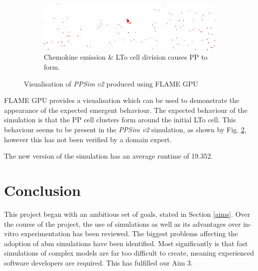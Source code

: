 \documentclass{UoYCSproject}
\begin{document}
\begin{figure}[htpb]\ContinuedFloat
\begin{subfigure}{\textwidth}
\centering
\includegraphics[width=\textwidth]{Appendix/Sim/Patch}
\caption{Chemokine emission \& \gls{LTo} cell division causes \gls{PP} to form.}
\label{fig:sim_patch}
\end{subfigure}


\caption{Visualisation of \textit{PPSim v2} produced using \gls{FLAME GPU}}
\label{fig:ppsimv2_vis}
\end{figure}

\gls{FLAME GPU} provides a visualisation which can be used to demonstrate the appearance of the expected emergent behaviour.
The expected behaviour of the simulation is that the \gls{PP} cell clusters form around the initial \gls{LTo} cell.
This behaviour seems to be present in the \textit{PPSim v2} simulation, as shown by Fig. \ref{fig:ppsimv2_vis}, however this has not been verified by a domain expert.

The new version of the simulation has an average runtime of 19.352.

\section{Conclusion}
This project began with an ambitious set of goals, stated in Section \ref{aims}.
Over the course of the project, the use of simulations as well as its advantages over \gls{in-vitro} experimentation has been reviewed.
The biggest problems affecting the adoption of \gls{abm} simulations have been identified.
Most significantly is that fast simulations of complex models are far too difficult to create, meaning experienced software developers are required.
This has fulfilled our Aim 3.
\end{document}
